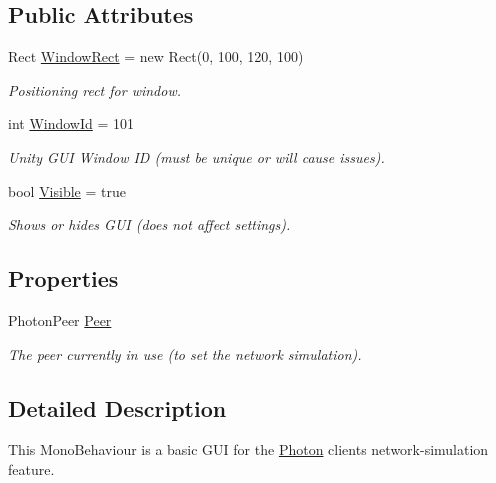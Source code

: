 \subsection*{Public Attributes}
\begin{DoxyCompactItemize}
\item 
Rect \hyperlink{class_photon_lag_simulation_gui_a1d267bda81b30f6b32f77e4b5cc90649}{Window\+Rect} = new Rect(0, 100, 120, 100)
\begin{DoxyCompactList}\small\item\em Positioning rect for window.\end{DoxyCompactList}\item 
int \hyperlink{class_photon_lag_simulation_gui_a0e20da80809bd2181828edabed39ccc9}{Window\+Id} = 101
\begin{DoxyCompactList}\small\item\em Unity G\+UI Window ID (must be unique or will cause issues).\end{DoxyCompactList}\item 
bool \hyperlink{class_photon_lag_simulation_gui_ad790a872afa4c4c1b34401f55982203a}{Visible} = true
\begin{DoxyCompactList}\small\item\em Shows or hides G\+UI (does not affect settings).\end{DoxyCompactList}\end{DoxyCompactItemize}
\subsection*{Properties}
\begin{DoxyCompactItemize}
\item 
Photon\+Peer \hyperlink{class_photon_lag_simulation_gui_ad6ae62fc67cdb2936b13029ec7c68d64}{Peer}
\begin{DoxyCompactList}\small\item\em The peer currently in use (to set the network simulation).\end{DoxyCompactList}\end{DoxyCompactItemize}


\subsection{Detailed Description}
This Mono\+Behaviour is a basic G\+UI for the \hyperlink{namespace_photon}{Photon} client\textquotesingle{}s network-\/simulation feature. 

